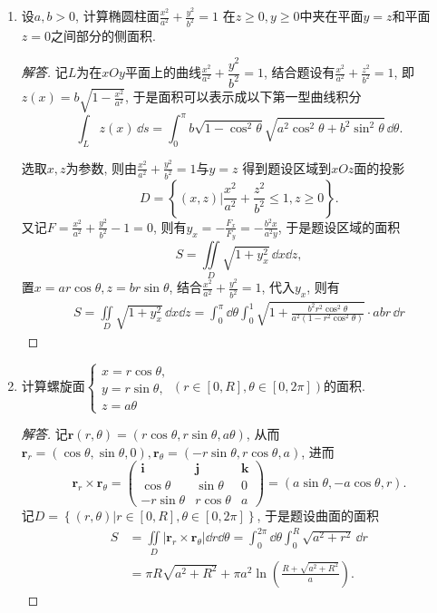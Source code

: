 \begin{quiza}
\begin{enumerate}
\item 设\(a,b>0\), 计算椭圆柱面\(\frac{x^2}{a^2}+\frac{y^2}{b^2}=1\)
在\(z\geqslant 0,y\geqslant 0\)中夹在平面\(y=z\)和平面\(z=0\)之间部分的侧面积.
\begin{proof}[解答]
记\(L\)为在\(xOy\)平面上的曲线\(\frac{x^2}{a^2}+\dfrac{y^2}{b^2}=1\), 
结合题设有\(\frac{x^2}{a^2}+\frac{z^2}{b^2}=1\), 
即\(z(x)=b\sqrt{1-\frac{x^2}{a^2}}\), 于是面积可以表示成以下第一型曲线积分
\[\int_Lz(x)\,\dd s=\int_{0}^{\pi}b\sqrt{1-\cos^2\theta}\sqrt{a^2\cos^2\theta+b^2\sin^2\theta}\,\dd\theta.\]

选取\(x,z\)为参数, 则由\(\frac{x^2}{a^2}+\frac{y^2}{b^2}=1\)与\(y=z\)
得到题设区域到\(xOz\)面的投影
\[D=\left\lbrace(x,z)\bigg| \frac{x^2}{a^2}+\frac{z^2}{b^2}\leqslant 1, z\geqslant 0 \right\rbrace .\]
又记\(F=\frac{x^2}{a^2}+\frac{y^2}{b^2}-1=0\), 
则有\(y_x=-\frac{F_x}{F_y}=-\frac{b^2x}{a^2y}\), 于是题设区域的面积
\[S=\iint\limits_D\sqrt{1+y_x^2}\,\dd x\dd z,\]
置\(x=ar\cos\theta,z=br\sin\theta\), 
结合\(\frac{x^2}{a^2}+\frac{y^2}{b^2}=1\), 代入\(y_x\), 则有\[\begin{split}
S=\iint\limits_D\sqrt{1+y_x^2}\,\dd x\dd z
=\int_{0}^{\pi}\dd\theta\int_{0}^{1}\sqrt{1+\frac{b^2r^2\cos^2\theta}{a^2\left(1-r^2\cos^2\theta\right)}}\cdot abr\,\dd r
\end{split}\]
\end{proof}

\item 计算螺旋面\(\begin{cases}
x=r\cos\theta,\\y=r\sin\theta,\\z=a\theta
\end{cases}\left(r\in[0,R],\theta\in[0,2\pi]\right)\)的面积.
\begin{proof}[解答]
记\(\boldsymbol{r}(r,\theta)=(r\cos\theta,r\sin\theta,a\theta)\), 
从而\(\boldsymbol{r}_r=(\cos\theta,\sin\theta,0),
\boldsymbol{r}_{\theta}=(-r\sin\theta,r\cos\theta,a)\), 进而
\[\boldsymbol{r}_r\times\boldsymbol{r}_\theta
=\begin{pmatrix}\boldsymbol{i}&\boldsymbol{j}&\boldsymbol{k}\\
\cos\theta&\sin\theta&0\\-r\sin\theta&r\cos\theta&a\end{pmatrix}
=(a\sin\theta,-a\cos\theta,r).\]
记\(D=\left\lbrace(r,\theta)\big|r\in[0,R],\theta\in[0,2\pi]\right\rbrace\), 
于是题设曲面的面积
\[\begin{split}
S&=\iint\limits_{D}\left|\boldsymbol{r}_r\times\boldsymbol{r}_{\theta}\right|\dd r\dd\theta
=\int_{0}^{2\pi}\dd\theta\int_{0}^{R}\sqrt{a^2+r^2}\,\dd r\\
&=\pi R\sqrt{a^2+R^2}+\pi a^2\ln\left(\frac{R+\sqrt{a^2+R^2}}{a}\right).
\end{split}\]
\end{proof}
 

\end{enumerate}
\end{quiza}
